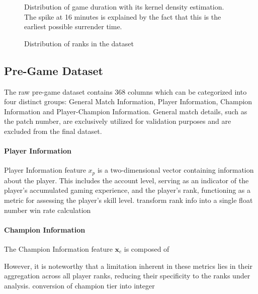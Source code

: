\documentclass[12pt, a4paper, headinclude, twoside, plainheadsepline, open=right, numbers=noenddot, hidelinks, toc=listof, toc=bibliography]{scrreprt}
\begin{document}
\begin{figure}[ht]

\caption{Distribution of game duration with its kernel density estimation. The spike at 16 minutes is explained by the fact that this is the earliest possible surrender time.}
\label{fig:gameDuration}
\end{figure}


\begin{figure}
\resizebox{\textwidth}{!}{}
\caption{Distribution of ranks in the dataset}
\label{fig:tier}
\end{figure}



\subsection{Pre-Game Dataset}
\label{ssec:pre_game_data}
The raw pre-game dataset contains $368$ columns which can be categorized into four distinct groups: General Match Information, Player Information, Champion Information and Player-Champion Information.
General match details, such as the patch number, are exclusively utilized for validation purposes and are excluded from the final dataset.
\paragraph{Player Information}
Player Information feature $x_p$ is a two-dimensional vector containing information about the player. This includes the account level, serving as an indicator of the player's accumulated gaming experience, and the player's rank, functioning as a metric for assessing the player's skill level.
transform rank info into a single float number
win rate calculation

\paragraph{Champion Information}
The Champion Information feature $\mathbf{x}_c$ is composed of 

However, it is noteworthy that a limitation inherent in these metrics lies in their aggregation across all player ranks, reducing their specificity to the ranks under analysis.
conversion of champion tier into integer
\end{document}
